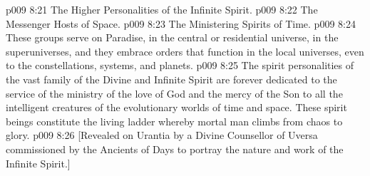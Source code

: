 \vs p009 8:21 \bibnobreakspace The Higher Personalities of the Infinite Spirit.
\vs p009 8:22 \bibnobreakspace The Messenger Hosts of Space.
\vs p009 8:23 \bibnobreakspace The Ministering Spirits of Time.
\vs p009 8:24 These groups serve on Paradise, in the central or residential universe, in the superuniverses, and they embrace orders that function in the local universes, even to the constellations, systems, and planets.
\vs p009 8:25 The spirit personalities of the vast family of the Divine and Infinite Spirit are forever dedicated to the service of the ministry of the love of God and the mercy of the Son to all the intelligent creatures of the evolutionary worlds of time and space. These spirit beings constitute the living ladder whereby mortal man climbs from chaos to glory.
\vsetoff
\vs p009 8:26 [Revealed on Urantia by a Divine Counsellor of Uversa commissioned by the Ancients of Days to portray the nature and work of the Infinite Spirit.]
\quizlink
